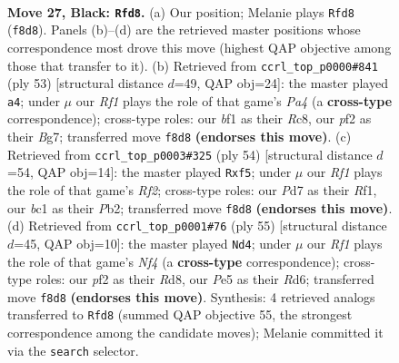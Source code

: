 \documentclass[11pt]{article}
\begin{document}
\clearpage

\begin{figure}[p]\centering
\begin{subfigure}{0.46\textwidth}\centering
\resizebox{\linewidth}{!}{%
\newchessgame
\chessboard[
  setfen={1r3r2/pbRp1pk1/8/4p2p/8/5nP1/PP3P1P/2BK1B1R b - - 3 27},
  showmover=false,
  pgfstyle=straightmove, color=movearrow, markmove={f8-d8}
]}
\caption{}
\end{subfigure}\hfill
\begin{subfigure}{0.46\textwidth}\centering
\resizebox{\linewidth}{!}{%
\newchessgame
\chessboard[
  setfen={2r1r1k1/3RB1bp/1p4p1/pP6/3p3P/6P1/P4P2/3R2K1 b - - 0 27},
  showmover=false,
  pgfstyle=straightmove, color=movearrow, markmove={a5-a4}
]}
\caption{}
\end{subfigure}
\\[4pt]
\begin{subfigure}{0.46\textwidth}\centering
\resizebox{\linewidth}{!}{%
\newchessgame
\chessboard[
  setfen={2k2r2/ppb1r2p/5N2/5p2/3p4/P6P/1PP2R2/1K3R2 w - - 2 28},
  showmover=false,
  pgfstyle=straightmove, color=movearrow, markmove={f2-f5}
]}
\caption{}
\end{subfigure}\hfill
\begin{subfigure}{0.46\textwidth}\centering
\resizebox{\linewidth}{!}{%
\newchessgame
\chessboard[
  setfen={3r4/pR6/3r1p1k/5n1p/1P2pP2/PB2b3/1B4PP/1K5R b - - 4 28},
  showmover=false,
  pgfstyle=straightmove, color=movearrow, markmove={f5-d4}
]}
\caption{}
\end{subfigure}
\caption{\textbf{Move 27, Black: \texttt{Rfd8}.} (a) Our position; Melanie plays \texttt{Rfd8} (\texttt{f8d8}). Panels (b)--(d) are the retrieved master positions whose correspondence most drove this move (highest QAP objective among those that transfer to it). (b) Retrieved from \texttt{ccrl\_top\_p0000\#841} (ply 53) [structural distance $d$=49, QAP obj=24]: the master played \texttt{a4}; under $\mu$ our \emph{Rf1} plays the role of that game's \emph{Pa4} (a \textbf{cross-type} correspondence); cross-type roles: our \emph{b}f1 as their \emph{R}c8, our \emph{p}f2 as their \emph{B}g7; transferred move \texttt{f8d8} \textbf{(endorses this move)}. (c) Retrieved from \texttt{ccrl\_top\_p0003\#325} (ply 54) [structural distance $d$=54, QAP obj=14]: the master played \texttt{Rxf5}; under $\mu$ our \emph{Rf1} plays the role of that game's \emph{Rf2}; cross-type roles: our \emph{P}d7 as their \emph{R}f1, our \emph{b}c1 as their \emph{P}b2; transferred move \texttt{f8d8} \textbf{(endorses this move)}. (d) Retrieved from \texttt{ccrl\_top\_p0001\#76} (ply 55) [structural distance $d$=45, QAP obj=10]: the master played \texttt{Nd4}; under $\mu$ our \emph{Rf1} plays the role of that game's \emph{Nf4} (a \textbf{cross-type} correspondence); cross-type roles: our \emph{p}f2 as their \emph{R}d8, our \emph{P}e5 as their \emph{R}d6; transferred move \texttt{f8d8} \textbf{(endorses this move)}. Synthesis: 4 retrieved analogs transferred to \texttt{Rfd8} (summed QAP objective 55, the strongest correspondence among the candidate moves); Melanie committed it via the \texttt{search} selector.}
\label{fig:thought-m53}
\end{figure}
\end{document}
